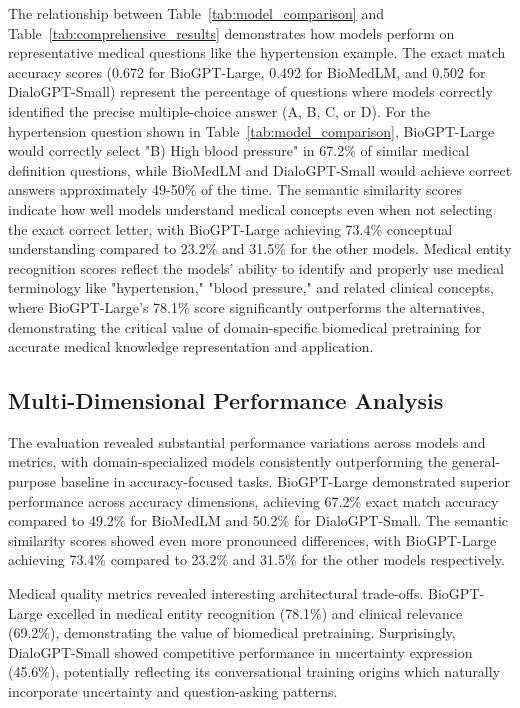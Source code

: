 \documentclass[conference]{IEEEtran}
\begin{document}
The relationship between Table~\ref{tab:model_comparison} and Table~\ref{tab:comprehensive_results} demonstrates how models perform on representative medical questions like the hypertension example. The exact match accuracy scores (0.672 for BioGPT-Large, 0.492 for BioMedLM, and 0.502 for DialoGPT-Small) represent the percentage of questions where models correctly identified the precise multiple-choice answer (A, B, C, or D). For the hypertension question shown in Table~\ref{tab:model_comparison}, BioGPT-Large would correctly select "B) High blood pressure" in 67.2\% of similar medical definition questions, while BioMedLM and DialoGPT-Small would achieve correct answers approximately 49-50\% of the time. The semantic similarity scores indicate how well models understand medical concepts even when not selecting the exact correct letter, with BioGPT-Large achieving 73.4\% conceptual understanding compared to 23.2\% and 31.5\% for the other models. Medical entity recognition scores reflect the models' ability to identify and properly use medical terminology like "hypertension," "blood pressure," and related clinical concepts, where BioGPT-Large's 78.1\% score significantly outperforms the alternatives, demonstrating the critical value of domain-specific biomedical pretraining for accurate medical knowledge representation and application.

\subsection{Multi-Dimensional Performance Analysis}

The evaluation revealed substantial performance variations across models and metrics, with domain-specialized models consistently outperforming the general-purpose baseline in accuracy-focused tasks. BioGPT-Large demonstrated superior performance across accuracy dimensions, achieving 67.2\% exact match accuracy compared to 49.2\% for BioMedLM and 50.2\% for DialoGPT-Small. The semantic similarity scores showed even more pronounced differences, with BioGPT-Large achieving 73.4\% compared to 23.2\% and 31.5\% for the other models respectively.

Medical quality metrics revealed interesting architectural trade-offs. BioGPT-Large excelled in medical entity recognition (78.1\%) and clinical relevance (69.2\%), demonstrating the value of biomedical pretraining. Surprisingly, DialoGPT-Small showed competitive performance in uncertainty expression (45.6\%), potentially reflecting its conversational training origins which naturally incorporate uncertainty and question-asking patterns.
\end{document}
